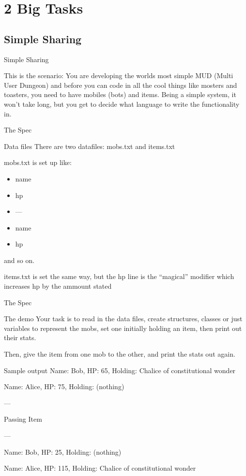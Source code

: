 \documentclass[10pt]{beamer}
\begin{document}
\section{2 Big Tasks}

\subsection{Simple Sharing}

\begin{frame}{Simple Sharing}
	\begin{block}{This is the scenario:}
	You are developing the worlds most simple MUD (Multi User Dungeon) and before you can code in all the cool things like mosters and toasters, you need to have mobiles (bots) and items.
	Being a simple system, it won't take long, but you get to decide what language to write the functionality in.
	\end{block}
\end{frame}

\begin{frame}{The Spec}
	\begin{block}{Data files}
	There are two datafiles: mobs.txt and items.txt

	mobs.txt is set up like:
	\begin{itemize}
		\item name
		\item hp
		\item ---
		\item name
		\item hp
	\end{itemize}
	and so on.

	items.txt is set the same way, but the hp line is the ``magical'' modifier which increases hp by the ammount stated
	\end{block}
\end{frame}

\begin{frame}{The Spec}
	\begin{block}{The demo}
	Your task is to read in the data files, create structures, classes or just variables to represent the mobs, set one initially holding an item, then print out their stats.

	Then, give the item from one mob to the other, and print the stats out again.
	\end{block}

	\begin{block}{Sample output}
Name: Bob, HP: 65, Holding: Chalice of constitutional wonder 

Name: Alice, HP: 75, Holding: (nothing)

---

Passing Item

---

Name: Bob, HP: 25, Holding: (nothing)

Name: Alice, HP: 115, Holding: Chalice of constitutional wonder 

	\end{block}
\end{frame}
\end{document}
